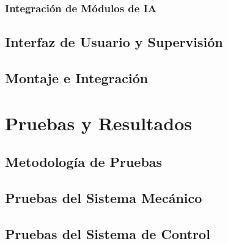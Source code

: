 \documentclass[a4paper,12pt]{report}
\begin{document}
\subsection{Integración de Módulos de IA}




\section{Interfaz de Usuario y Supervisión}





\section{Montaje e Integración}





\chapter{Pruebas y Resultados}

\section{Metodología de Pruebas}



\section{Pruebas del Sistema Mecánico}





\section{Pruebas del Sistema de Control}



\end{document}
